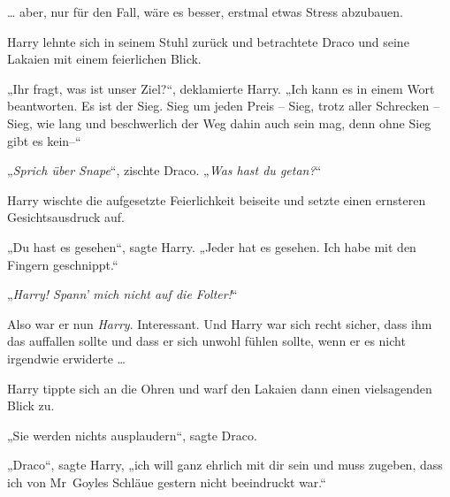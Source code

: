 … aber, nur für den Fall, wäre es besser, erstmal etwas Stress abzubauen.

Harry lehnte sich in seinem Stuhl zurück und betrachtete Draco und seine Lakaien mit einem feierlichen Blick.

„Ihr fragt, was ist unser Ziel?“, deklamierte Harry. „Ich kann es in einem Wort beantworten. Es ist der Sieg. Sieg um jeden Preis – Sieg, trotz aller Schrecken – Sieg, wie lang und beschwerlich der Weg dahin auch sein mag, denn ohne Sieg gibt es kein–“

„\emph{Sprich über Snape}“, zischte Draco. „\emph{Was hast du getan?}“

Harry wischte die aufgesetzte Feierlichkeit beiseite und setzte einen ernsteren Gesichtsausdruck auf.

„Du hast es gesehen“, sagte Harry. „Jeder hat es gesehen. Ich habe mit den Fingern geschnippt.“

„\emph{Harry! Spann’ mich nicht auf die Folter!}“

Also war er nun \emph{Harry}. Interessant. Und Harry war sich recht sicher, dass ihm das auffallen sollte und dass er sich unwohl fühlen sollte, wenn er es nicht irgendwie erwiderte …

Harry tippte sich an die Ohren und warf den Lakaien dann einen vielsagenden Blick zu.

„Sie werden nichts ausplaudern“, sagte Draco.

„Draco“, sagte Harry, „ich will ganz ehrlich mit dir sein und muss zugeben, dass ich von Mr~Goyles Schläue gestern nicht beeindruckt war.“

